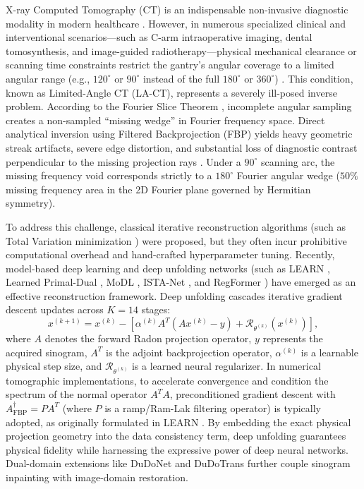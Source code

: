 \documentclass[runningheads]{llncs}
\begin{document}
X-ray Computed Tomography (CT) is an indispensable non-invasive diagnostic modality in modern healthcare \cite{wang2020deep,kak2001principles}. However, in numerous specialized clinical and interventional scenarios---such as C-arm intraoperative imaging, dental tomosynthesis, and image-guided radiotherapy---physical mechanical clearance or scanning time constraints restrict the gantry's angular coverage to a limited angular range (e.g., $120^\circ$ or $90^\circ$ instead of the full $180^\circ$ or $360^\circ$) \cite{chen2018learn,sidky2008image}. This condition, known as Limited-Angle CT (LA-CT), represents a severely ill-posed inverse problem. According to the Fourier Slice Theorem \cite{kak2001principles}, incomplete angular sampling creates a non-sampled ``missing wedge'' in Fourier frequency space. Direct analytical inversion using Filtered Backprojection (FBP) yields heavy geometric streak artifacts, severe edge distortion, and substantial loss of diagnostic contrast perpendicular to the missing projection rays \cite{chen2018learn,sidky2008image}. Under a $90^\circ$ scanning arc, the missing frequency void corresponds strictly to a $180^\circ$ Fourier angular wedge ($50\%$ missing frequency area in the 2D Fourier plane governed by Hermitian symmetry).

To address this challenge, classical iterative reconstruction algorithms (such as Total Variation minimization \cite{sidky2008image}) were proposed, but they often incur prohibitive computational overhead and hand-crafted hyperparameter tuning. Recently, model-based deep learning and deep unfolding networks (such as LEARN \cite{chen2018learn}, Learned Primal-Dual \cite{adler2018learned}, MoDL \cite{aggarwal2019modl}, ISTA-Net \cite{zhang2018ista}, and RegFormer \cite{wang2023regformer}) have emerged as an effective reconstruction framework. Deep unfolding cascades iterative gradient descent updates across $K = 14$ stages:
\begin{equation}
x^{(k+1)} = x^{(k)} - \left[ \alpha^{(k)} A^T(A x^{(k)} - y) + \mathcal{R}_{\theta^{(k)}}(x^{(k)}) \right],
\label{eq:unroll_basic}
\end{equation}
where $A$ denotes the forward Radon projection operator, $y$ represents the acquired sinogram, $A^T$ is the adjoint backprojection operator, $\alpha^{(k)}$ is a learnable physical step size, and $\mathcal{R}_{\theta^{(k)}}$ is a learned neural regularizer. In numerical tomographic implementations, to accelerate convergence and condition the spectrum of the normal operator $A^TA$, preconditioned gradient descent with $A^\dagger_{\text{FBP}} = P A^T$ (where $P$ is a ramp/Ram-Lak filtering operator) is typically adopted, as originally formulated in LEARN \cite{chen2018learn}. By embedding the exact physical projection geometry into the data consistency term, deep unfolding guarantees physical fidelity while harnessing the expressive power of deep neural networks. Dual-domain extensions like DuDoNet \cite{lin2019dudonet} and DuDoTrans \cite{wang2022dudotrans} further couple sinogram inpainting with image-domain restoration.
\end{document}

